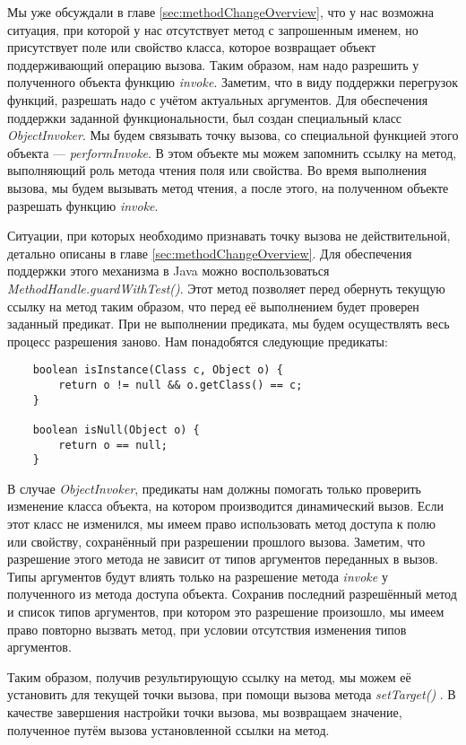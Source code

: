 Мы уже обсуждали в главе \ref{sec:methodChangeOverview}, что у нас возможна ситуация, при которой у нас отсутствует метод с запрошенным именем, но присутствует поле или свойство класса, которое возвращает объект поддерживающий операцию вызова.
Таким образом, нам надо разрешить у полученного объекта функцию \textit{invoke}. Заметим, что в виду поддержки перегрузок функций, разрешать надо с учётом актуальных аргументов. Для обеспечения поддержки заданной функциональности, был создан специальный класс \textit{ObjectInvoker}. Мы будем связывать точку вызова, со специальной функцией этого объекта --- \textit{performInvoke}. В этом объекте мы можем запомнить ссылку на метод, выполняющий роль метода чтения поля или свойства. Во время выполнения вызова, мы будем вызывать метод чтения, а после этого, на полученном объекте разрешать функцию \textit{invoke}.


Ситуации, при которых необходимо признавать точку вызова не действительной, детально описаны в главе \ref{sec:methodChangeOverview}. Для обеспечения поддержки этого механизма в Java можно воспользоваться \textit{MethodHandle.guardWithTest()}. Этот метод позволяет перед обернуть текущую ссылку на метод таким образом, что перед её выполнением будет проверен заданный предикат. При не выполнении предиката, мы будем осуществлять весь процесс разрешения заново. Нам понадобятся следующие предикаты:

\begin{verbatim}
    boolean isInstance(Class c, Object o) {
        return o != null && o.getClass() == c;
    }

    boolean isNull(Object o) {
        return o == null;
    }
\end{verbatim} 

В случае \textit{ObjectInvoker}, предикаты нам должны помогать только проверить изменение класса объекта, на котором производится динамический вызов. Если этот класс не изменился, мы имеем право использовать метод доступа к полю или свойству, сохранённый при разрешении прошлого вызова. Заметим, что разрешение этого метода не зависит от типов аргументов переданных в вызов. Типы аргументов будут влиять только на разрешение метода \textit{invoke} у полученного из метода доступа объекта. Сохранив последний разрешённый метод и список типов аргументов, при котором это разрешение произошло, мы имеем право повторно вызвать метод, при условии отсутствия изменения типов аргументов.

Таким образом, получив результирующую ссылку на метод, мы можем её установить для текущей точки вызова, при помощи вызова метода 	\textit{setTarget()} \cite{javadoc:MutableCallSite}. В качестве завершения настройки точки вызова, мы возвращаем значение, полученное путём вызова установленной ссылки на метод.